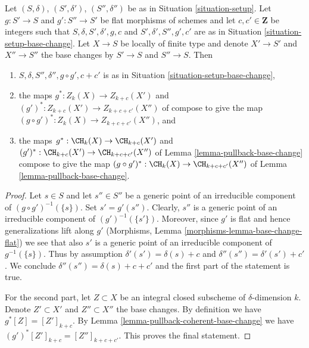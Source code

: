 \begin{lemma}
\label{lemma-compose-base-change}
Let $(S, \delta)$, $(S', \delta')$, $(S'', \delta'')$ be as in
Situation \ref{situation-setup}. Let $g : S' \to S$ and $g' : S'' \to S'$
be flat morphisms of schemes and let $c, c' \in \mathbf{Z}$
be integers such that $S, \delta, S', \delta', g, c$ and
$S', \delta', S'', g', c'$ are as in
Situation \ref{situation-setup-base-change}.
Let $X \to S$ be locally of finite type and denote $X' \to S'$
and $X'' \to S''$ the base changes by $S' \to S$ and $S'' \to S$.
Then
\begin{enumerate}
\item $S, \delta, S'', \delta'', g \circ g', c + c'$ is as in
Situation \ref{situation-setup-base-change},
\item the maps $g^* : Z_k(X) \to Z_{k + c}(X')$ and
$(g')^* : Z_{k + c}(X') \to Z_{k + c + c'}(X'')$ of
compose to give the map $(g \circ g')^* : Z_k(X) \to Z_{k + c + c'}(X'')$, and
\item the maps $g^* : \CH_k(X) \to \CH_{k + c}(X')$ and
$(g')^* : \CH_{k + c}(X') \to \CH_{k + c + c'}(X'')$ of
Lemma \ref{lemma-pullback-base-change}
compose to give the map $(g \circ g')^* : \CH_k(X) \to \CH_{k + c + c'}(X'')$
of Lemma \ref{lemma-pullback-base-change}.
\end{enumerate}
\end{lemma}

\begin{proof}
Let $s \in S$ and let $s'' \in S''$ be a generic point of an irreducible
component of $(g \circ g')^{-1}(\{s\})$. Set $s' = g'(s'')$.
Clearly, $s''$ is a generic point of an irreducible component of
$(g')^{-1}(\{s'\})$. Moreover, since $g'$ is flat and hence generalizations
lift along $g'$ (Morphisms, Lemma \ref{morphisms-lemma-base-change-flat})
we see that also $s'$ is a generic point of an irreducible component
of $g^{-1}(\{s\})$. Thus by assumption $\delta'(s') = \delta(s) + c$
and $\delta''(s'') = \delta'(s') + c'$. We conclude
$\delta''(s'') = \delta(s) + c + c'$ and the first part of the
statement is true.

\medskip\noindent
For the second part, let $Z \subset X$ be an integral closed subscheme
of $\delta$-dimension $k$. Denote $Z' \subset X'$ and $Z'' \subset X''$
the base changes. By definition we have $g^*[Z] = [Z']_{k + c}$.
By Lemma \ref{lemma-pullback-coherent-base-change} we have
$(g')^*[Z']_{k + c} = [Z'']_{k + c + c'}$. This proves the final statement.
\end{proof}

